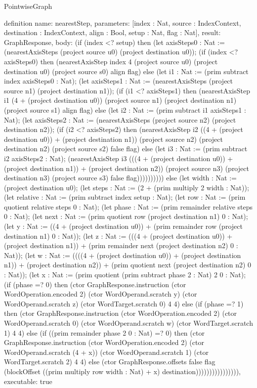 \begin{lexlean}{PointwiseGraph}
\begin{semanticmodule}
definition{
  name: nearestStep,
  parameters: [index : Nat, source : IndexContext, destination : IndexContext, align : Bool, setup : Nat, flag : Nat],
  result: GraphResponse,
  body: (if (index <? setup) then (let axisSteps0 : Nat := (nearestAxisSteps (project source u0) (project destination u0));
      (if (index <? axisSteps0) then (nearestAxisStep index 4 (project source u0) (project destination u0) (project source s0) align flag) else (let i1 : Nat := (prim subtract index axisSteps0 : Nat);
      (let axisSteps1 : Nat := (nearestAxisSteps (project source n1) (project destination n1));
      (if (i1 <? axisSteps1) then (nearestAxisStep i1 (4 + (project destination u0)) (project source n1) (project destination n1) (project source s1) align flag) else (let i2 : Nat := (prim subtract i1 axisSteps1 : Nat);
      (let axisSteps2 : Nat := (nearestAxisSteps (project source n2) (project destination n2));
      (if (i2 <? axisSteps2) then (nearestAxisStep i2 ((4 + (project destination u0)) + (project destination n1)) (project source n2) (project destination n2) (project source s2) false flag) else (let i3 : Nat := (prim subtract i2 axisSteps2 : Nat);
      (nearestAxisStep i3 (((4 + (project destination u0)) + (project destination n1)) + (project destination n2)) (project source n3) (project destination n3) (project source s3) false flag)))))))))) else (let width : Nat := (project destination u0);
      (let steps : Nat := (2 + (prim multiply 2 width : Nat));
      (let relative : Nat := (prim subtract index setup : Nat);
      (let row : Nat := (prim quotient relative steps 0 : Nat);
      (let phase : Nat := (prim remainder relative steps 0 : Nat);
      (let next : Nat := (prim quotient row (project destination n1) 0 : Nat);
      (let y : Nat := ((4 + (project destination u0)) + (prim remainder row (project destination n1) 0 : Nat));
      (let z : Nat := (((4 + (project destination u0)) + (project destination n1)) + (prim remainder next (project destination n2) 0 : Nat));
      (let w : Nat := ((((4 + (project destination u0)) + (project destination n1)) + (project destination n2)) + (prim quotient next (project destination n2) 0 : Nat));
      (let x : Nat := (prim quotient (prim subtract phase 2 : Nat) 2 0 : Nat);
      (if (phase =? 0) then (ctor GraphResponse.instruction (ctor WordOperation.encoded 2) (ctor WordOperand.scratch y) (ctor WordOperand.scratch z) (ctor WordTarget.scratch 0) 4 4) else (if (phase =? 1) then (ctor GraphResponse.instruction (ctor WordOperation.encoded 2) (ctor WordOperand.scratch 0) (ctor WordOperand.scratch w) (ctor WordTarget.scratch 1) 4 4) else (if ((prim remainder phase 2 0 : Nat) =? 0) then (ctor GraphResponse.instruction (ctor WordOperation.encoded 2) (ctor WordOperand.scratch (4 + x)) (ctor WordOperand.scratch 1) (ctor WordTarget.scratch 2) 4 4) else (ctor GraphResponse.offsets false flag (blockOffset ((prim multiply row width : Nat) + x) destination)))))))))))))))),
  executable: true
}


\end{semanticmodule}
\end{lexlean}
